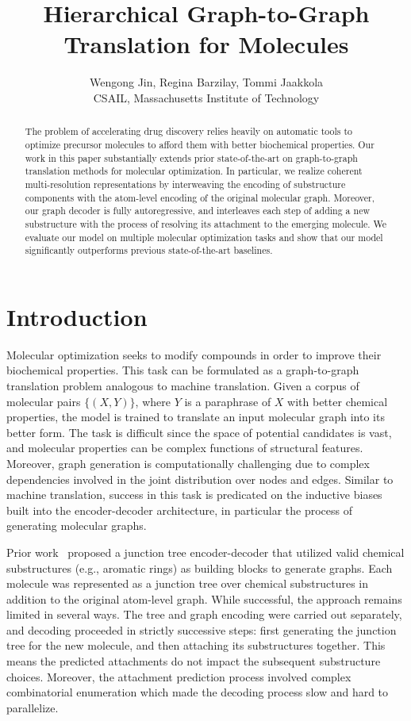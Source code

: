 \documentclass{article} \usepackage{iclr2020_conference,times}
\title{Hierarchical Graph-to-Graph Translation for Molecules}
\author{Wengong Jin,\;
  Regina Barzilay,\;
  Tommi Jaakkola \\
  CSAIL, Massachusetts Institute of Technology \\
}
\newcommand{\set}[1]{\{ #1 \}}
\begin{document}
\maketitle
\begin{abstract}
The problem of accelerating drug discovery relies heavily on automatic tools to optimize precursor molecules to afford them with better biochemical properties. Our work in this paper substantially extends prior state-of-the-art on graph-to-graph translation methods for molecular optimization. In particular, we realize coherent multi-resolution representations by interweaving the encoding of substructure components with the atom-level encoding of the original molecular graph. Moreover, our graph decoder is fully autoregressive, and interleaves each step of adding a new substructure with the process of resolving its attachment to the emerging molecule. We evaluate our model on multiple molecular optimization tasks and show that our model significantly outperforms previous state-of-the-art baselines.
\end{abstract}
 \section{Introduction}

Molecular optimization seeks to modify compounds in order to improve their biochemical properties. 
This task can be formulated as a graph-to-graph translation problem analogous to machine translation. Given a corpus of molecular pairs $\set{(X,Y)}$, where $Y$ is a paraphrase of $X$ with better chemical properties, the model is trained to translate an input molecular graph into its better form.
The task is difficult since the space of potential candidates is vast, and molecular properties can be complex functions of structural features.
Moreover, graph generation is computationally challenging due to complex dependencies involved in the joint distribution over nodes and edges. 
Similar to machine translation, success in this task is predicated on the inductive biases built into the encoder-decoder architecture, in particular the process of generating molecular graphs.

Prior work~\citep{jin2018learning} proposed a junction tree encoder-decoder that utilized valid chemical substructures (e.g., aromatic rings) as building blocks to generate graphs. Each molecule was represented as a junction tree over chemical substructures in addition to the original atom-level graph. 
While successful, the approach remains limited in several ways. 
The tree and graph encoding were carried out separately, and decoding proceeded in strictly successive steps: first generating the junction tree for the new molecule, and then attaching its substructures together. This means the predicted attachments do not impact the subsequent substructure choices.
Moreover, the attachment prediction process involved complex combinatorial enumeration which made the decoding process slow and hard to parallelize.
\end{document}
